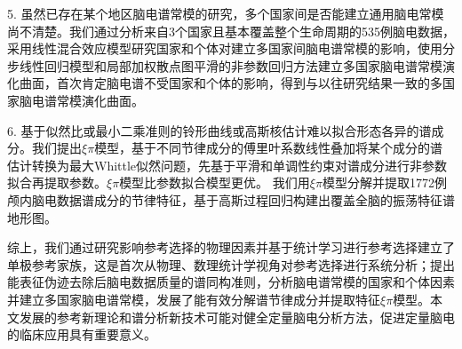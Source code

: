 \begin{chineseabstract}
5. 虽然已存在某个地区脑电谱常模的研究，多个国家间是否能建立通用脑电常模尚不清楚。我们通过分析来自3个国家且基本覆盖整个生命周期的535例脑电数据，采用线性混合效应模型研究国家和个体对建立多国家间脑电谱常模的影响，使用分步线性回归模型和局部加权散点图平滑的非参数回归方法建立多国家脑电谱常模演化曲面，首次肯定脑电谱不受国家和个体的影响，得到与以往研究结果一致的多国家脑电谱常模演化曲面。

6. 基于似然比或最小二乘准则的铃形曲线或高斯核估计难以拟合形态各异的谱成分。我们提出$\xi\pi$模型，基于不同节律成分的傅里叶系数线性叠加将某个成分的谱估计转换为最大Whittle似然问题，先基于平滑和单调性约束对谱成分进行非参数拟合再提取参数。$\xi\pi$模型比参数拟合模型更优。
我们用$\xi\pi$模型分解并提取1772例颅内脑电数据谱成分的节律特征，基于高斯过程回归构建出覆盖全脑的振荡特征谱地形图。

综上，我们通过研究影响参考选择的物理因素并基于统计学习进行参考选择建立了单极参考家族，这是首次从物理、数理统计学视角对参考选择进行系统分析；提出能表征伪迹去除后脑电数据质量的谱同构准则，分析脑电谱常模的国家和个体因素并建立多国家脑电谱常模，发展了能有效分解谱节律成分并提取特征$\xi\pi$模型。本文发展的参考新理论和谱分析新技术可能对健全定量脑电分析方法，促进定量脑电的临床应用具有重要意义。

\end{chineseabstract}


